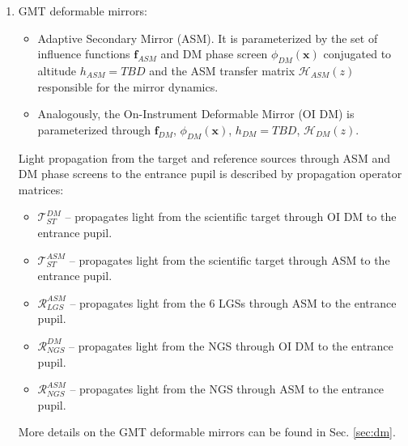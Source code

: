 \begin{enumerate}
	\item GMT deformable mirrors:
	\begin{itemize}
		\item Adaptive Secondary Mirror (ASM). It is parameterized by the set of
		influence functions $\bm{f}_{ASM}$ and DM phase screen
		$\phi_{DM}(\bm{x})$ conjugated to altitude $h_{ASM} = TBD$ and the
		ASM transfer matrix
		$\mathcal{H}_{ASM}(z)$ responsible for the mirror dynamics.
		\item Analogously, the On-Instrument Deformable Mirror (OI DM) is
		parameterized through $\bm{f}_{DM}$,
		$\phi_{DM}(\bm{x})$, $h_{DM} = TBD$, $\mathcal{H}_{DM}(z)$.
	\end{itemize}
	Light propagation from the target and reference sources through ASM and
	DM phase screens to the entrance pupil is described by propagation operator
	matrices:
	\begin{itemize}
		\item $\mathcal{T}_{ST}^{DM}$ -- propagates light from the scientific
		target through OI DM to the entrance pupil.
		\item $\mathcal{T}_{ST}^{ASM}$ -- propagates light from the scientific
		target through ASM to the entrance pupil.
		\item $\mathcal{R}_{LGS}^{ASM}$ -- propagates light from the 6 LGSs
		through ASM to the entrance pupil.
		\item $\mathcal{R}_{NGS}^{DM}$ -- propagates light from the NGS
		through OI DM to the entrance pupil.
		\item $\mathcal{R}_{NGS}^{ASM}$ -- propagates light from the NGS
		through ASM to the entrance pupil.
	\end{itemize}
  More details on the GMT deformable mirrors can be found in Sec. \ref{sec:dm}.


\end{enumerate}
